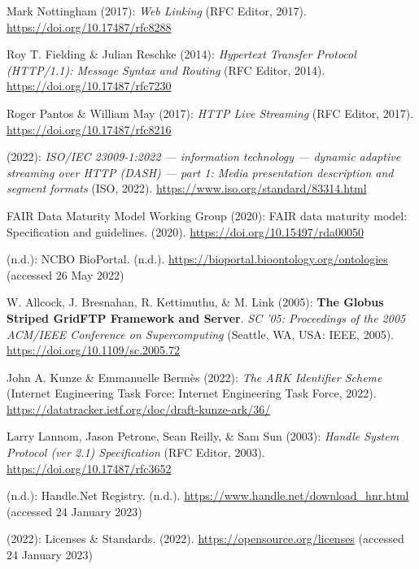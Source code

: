 \begin{thebibliography}{9}
Mark Nottingham (2017): \emph{Web {Linking}} ({RFC Editor}, 2017).
\url{https://doi.org/10.17487/rfc8288}

Roy T. Fielding \& Julian Reschke (2014): \emph{Hypertext {Transfer
Protocol} ({HTTP}/1.1): {Message Syntax} and {Routing}} ({RFC Editor},
2014).
\url{https://doi.org/10.17487/rfc7230}

Roger Pantos \& William May (2017): \emph{{HTTP Live Streaming}} ({RFC
Editor}, 2017).
\url{https://doi.org/10.17487/rfc8216}

(2022): \emph{{ISO}/{IEC} 23009-1:2022 --- information technology ---
dynamic adaptive streaming over HTTP (DASH) --- part 1: Media
presentation description and segment formats} ({ISO}, 2022).
\url{https://www.iso.org/standard/83314.html}

FAIR Data Maturity Model Working Group (2020): {FAIR} data maturity
model: {Specification} and guidelines. (2020).
\url{https://doi.org/10.15497/rda00050}

(n.d.): {NCBO BioPortal}. (n.d.).
\url{https://bioportal.bioontology.org/ontologies} (accessed 26 May
2022)

W. Allcock, J. Bresnahan, R. Kettimuthu, \& M. Link (2005): \textbf{The
{Globus Striped GridFTP Framework} and {Server}}. \emph{{SC '05:
Proceedings of the 2005 ACM/IEEE Conference on Supercomputing}}
({Seattle, WA, USA}: {IEEE}, 2005).
\url{https://doi.org/10.1109/sc.2005.72}

John A. Kunze \& Emmanuelle Bermès (2022): \emph{{The ARK Identifier
Scheme}} (Internet Engineering Task Force; Internet Engineering Task
Force, 2022). \url{https://datatracker.ietf.org/doc/draft-kunze-ark/36/}

Larry Lannom, Jason Petrone, Sean Reilly, \& Sam Sun (2003):
\emph{Handle {System Protocol} (ver 2.1) {Specification}} ({RFC Editor},
2003).
\url{https://doi.org/10.17487/rfc3652}

(n.d.): Handle.{Net Registry}. (n.d.).
\url{https://www.handle.net/download_hnr.html} (accessed 24 January
2023)

(2022): Licenses \& {Standards}. (2022).
\url{https://opensource.org/licenses} (accessed 24 January 2023)


\end{thebibliography}
